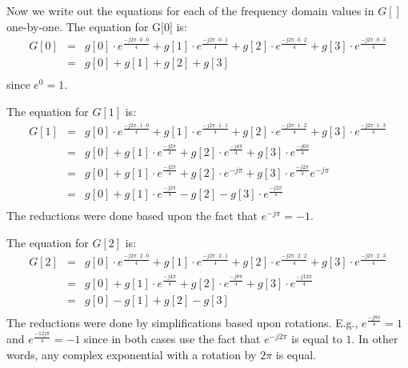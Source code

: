 Now we write out the equations for each of the frequency domain values in $G[]$ one-by-one. The equation for G[0] is:
\begin{equation}
\begin{array} {lll} 
G[0] & = & g[0] \cdot e^{\frac{-j 2 \pi \cdot 0 \cdot 0}{4}} + g[1] \cdot e^{\frac{-j 2 \pi \cdot 0 \cdot 1}{4}} + g[2] \cdot e^{\frac{-j 2 \pi \cdot 0 \cdot 2}{4}} + g[3] \cdot e^{\frac{-j 2 \pi \cdot 0 \cdot 3}{4}}\\
 & = & g[0] + g[1] + g[2] + g[3] \\
\end{array}
\end{equation} since $e^0 = 1$. 

The equation for $G[1]$ is:
\begin{equation}
\begin{array} {lll} 
G[1] & = & g[0] \cdot e^{\frac{-j 2 \pi \cdot 1 \cdot 0}{4}} + g[1] \cdot e^{\frac{-j 2 \pi \cdot 1 \cdot 1}{4}} + g[2] \cdot e^{\frac{-j 2 \pi \cdot 1 \cdot 2}{4}} + g[3] \cdot e^{\frac{-j 2 \pi \cdot 1 \cdot 3}{4}}\\
 & = & g[0] + g[1] \cdot e^{\frac{-j 2 \pi}{4}} + g[2] \cdot e^{\frac{-j 4 \pi}{4}} + g[3] \cdot e^{\frac{-j 6 \pi}{4}}\\
 & = & g[0] + g[1] \cdot e^{\frac{-j 2 \pi}{4}} + g[2] \cdot e^{-j \pi}   + g[3] \cdot e^{\frac{-j 2 \pi}{4}} e^{-j \pi} \\
 & = & g[0] + g[1] \cdot e^{\frac{-j 2 \pi}{4}} - g[2] - g[3] \cdot e^{\frac{-j 2 \pi}{4}}\\
\end{array} 
\end{equation} The reductions were done based upon the fact that $e^{-j \pi} = -1$. 

The equation for $G[2]$ is:
\begin{equation}
\begin{array} {lll} 
G[2] & = & g[0] \cdot e^{\frac{-j 2 \pi \cdot 2 \cdot 0}{4}} + g[1] \cdot e^{\frac{-j 2 \pi \cdot 2 \cdot 1}{4}} + g[2] \cdot e^{\frac{-j 2 \pi \cdot 2 \cdot 2}{4}} + g[3] \cdot e^{\frac{-j 2 \pi \cdot 2 \cdot 3}{4}}\\
 & = & g[0] + g[1] \cdot e^{\frac{-j 4 \pi}{4}} + g[2] \cdot e^{\frac{-j 8 \pi}{4}} + g[3] \cdot e^{\frac{-j 12 \pi}{4}}\\
 & = & g[0] - g[1]  + g[2] -  g[3] \\
\end{array} 
\end{equation} The reductions were done by simplifications based upon rotations. E.g., $e^{\frac{-j 8 \pi}{4}} = 1$ and $e^{\frac{-12 j \pi}{4}} = -1$ since in both cases use the fact that $e^{-j 2\pi}$ is equal to $1$. In other words, any complex exponential with a rotation by $2 \pi$ is equal.

